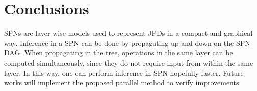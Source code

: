 \section{Conclusions}
\label{sec:conc}

SPNs are layer-wise models used to represent JPDs in a compact and graphical way.
Inference in a SPN can be done by propagating up and down on the SPN DAG.
When propagating in the tree, operations in the same layer can be computed simultaneously, since they do not require input from within the same layer.
In this way, one can perform inference in SPN hopefully faster.
Future works will implement the proposed parallel method to verify improvements.